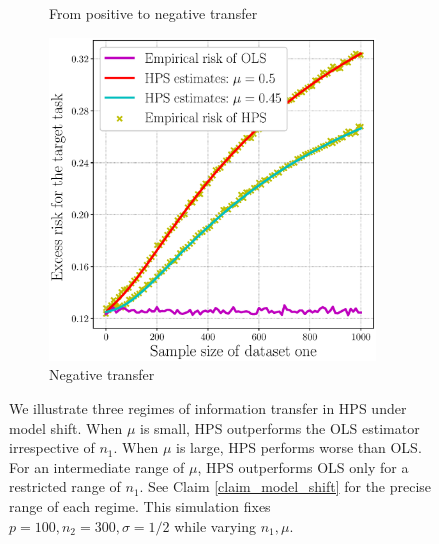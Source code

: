 \begin{figure}[!t]
\begin{subfigure}[b]{0.33\textwidth}
		\caption{From positive to negative transfer}
		\label{fig_sec3_model_transition}
	\end{subfigure}\hfill%
	\begin{subfigure}[b]{0.33\textwidth}
		\centering
		\includegraphics[width=0.95\textwidth]{figures/model_shift_negative.eps}
		\caption{Negative transfer}
		\label{fig_sec3_model_negative}
	\end{subfigure}	
	\caption{We illustrate three regimes of information transfer in HPS under model shift. When $\mu$ is small, HPS outperforms the OLS estimator irrespective of $n_1$. When $\mu$ is large, HPS performs worse than OLS. For an intermediate range of $\mu$, HPS outperforms OLS only for a restricted range of $n_1$. See Claim \ref{claim_model_shift} for the precise range of each regime. This simulation fixes $p = 100, n_2 = 300, \sigma = 1/2$ while varying $n_1, \mu$.}
	\label{fig_sec3_model_shift}
\end{figure}

